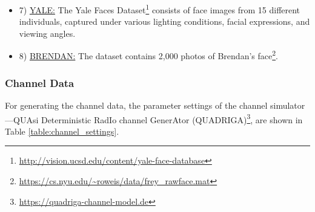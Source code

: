 \begin{itemize}
{    }

    \item{
        7) \underline{YALE:} The Yale Faces Dataset\footnote{\url{http://vision.ucsd.edu/content/yale-face-database}} consists of face images from 15 different individuals, captured under various lighting conditions, facial expressions, and viewing angles.      
    }

    
    \item{
        8) \underline{BRENDAN:} The dataset contains 2,000 photos of Brendan's face\footnote{\url{https://cs.nyu.edu/~roweis/data/frey_rawface.mat}}.      
    }

\end{itemize}


\subsubsection{Channel Data}
\label{app:channel_data}
For generating the channel data, the parameter settings of the channel simulator—QUAsi Deterministic RadIo channel GenerAtor (QUADRIGA)\footnote{\url{https://quadriga-channel-model.de}}, are shown in Table \ref{table:channel_settings}.

